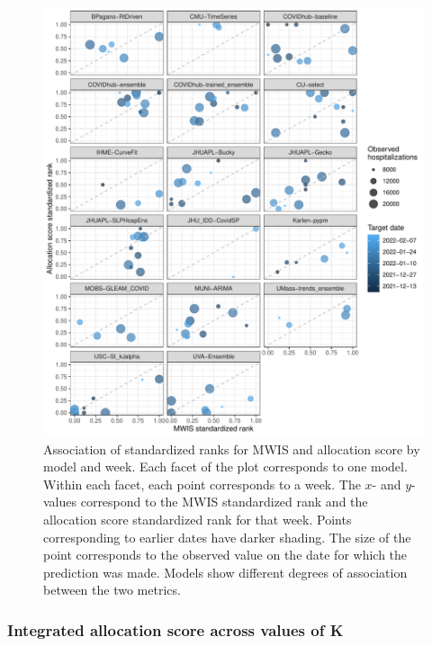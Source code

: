 \documentclass{article}\usepackage[]{graphicx}\usepackage[]{xcolor}
\makeatletter
\def\maxwidth{ %
  \ifdim\Gin@nat@width>\linewidth
    \linewidth
  \else
    \Gin@nat@width
  \fi
}
\newenvironment{knitrout}{}{} %
\makeatother
\begin{document}
\begin{knitrout}
\color{fgcolor}\begin{figure}
\includegraphics[width=\maxwidth]{figure/metrics-correlation-1} \caption[Association of standardized ranks for MWIS and allocation score by model and week]{Association of standardized ranks for MWIS and allocation score by model and week. Each facet of the plot corresponds to one model. Within each facet, each point corresponds to a week. The $x$- and $y$-values correspond to the MWIS standardized rank and the allocation score standardized rank for that week. Points corresponding to earlier dates have darker shading. The size of the point corresponds to the observed value on the date for which the prediction was made. Models show different degrees of association between the two metrics.}\label{fig:metrics-correlation}
\end{figure}

\end{knitrout}




\subsubsection{Integrated allocation score across values of K}
\label{sec:ias_examp}
\end{document}

